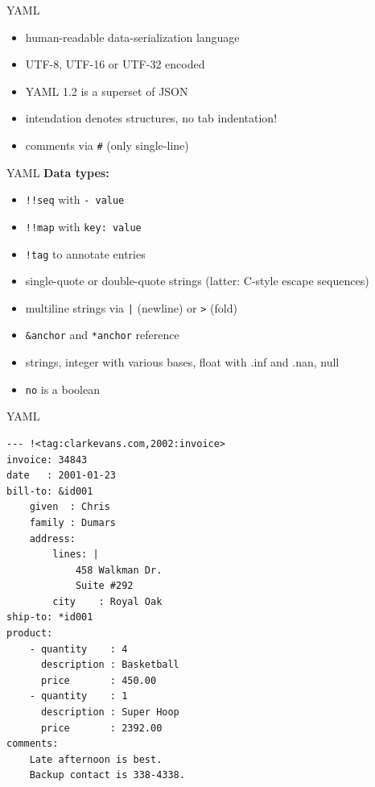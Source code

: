 \documentclass{beamer}
\begin{document}
\begin{frame}[fragile]{YAML}
  \begin{itemize}
    \item human-readable data-serialization language
    \item UTF-8, UTF-16 or UTF-32 encoded
    \item YAML 1.2 is a superset of JSON
    \item intendation denotes structures, no tab indentation!
    \item comments via \texttt{#} (only single-line)
  \end{itemize}
\end{frame}

\begin{frame}[fragile]{YAML}
  \textbf{Data types:}
  \begin{itemize}
    \item \texttt{!!seq} with \texttt{- value}
    \item \texttt{!!map} with \texttt{key: value}
    \item \texttt{!tag} to annotate entries
    \item single-quote or double-quote strings (latter: C-style escape sequences)
    \item multiline strings via \texttt{|} (newline) or \texttt{>} (fold)
    \item \texttt{&anchor} and \texttt{*anchor} reference
    \item strings, integer with various bases, float with .inf and .nan, null
    \item \texttt{no} is a boolean
  \end{itemize}
\end{frame}

\begin{frame}[fragile]{YAML}
  \begin{verbatim}
--- !<tag:clarkevans.com,2002:invoice>
invoice: 34843
date   : 2001-01-23
bill-to: &id001
    given  : Chris
    family : Dumars
    address:
        lines: |
            458 Walkman Dr.
            Suite #292
        city    : Royal Oak
ship-to: *id001
product:
    - quantity    : 4
      description : Basketball
      price       : 450.00
    - quantity    : 1
      description : Super Hoop
      price       : 2392.00
comments:
    Late afternoon is best.
    Backup contact is 338-4338.
  \end{verbatim}
\end{frame}
\end{document}
